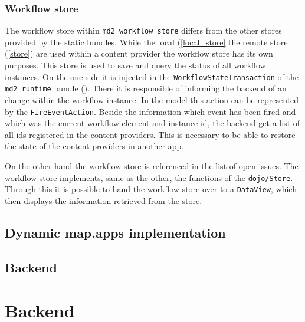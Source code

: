 \subsubsection{Workflow store} \label{workflow_store}

The workflow store within \lstinline|md2_workflow_store| differs from the other stores provided by the static bundles. While the local (\cref{local_store} the remote store (\cref{store}) are used within a content provider the workflow store has its own purposes. This store is used to save and query the status of all workflow instances. On the one side it is injected in the \lstinline|WorkflowStateTransaction| of the \lstinline|md2_runtime| bundle (). There it is responsible of informing the backend of an change within the workflow instance. In the model this action can be represented by the \lstinline|FireEventAction|. Beside the information which event has been fired and which was the current workflow element and instance id, the backend get a list of all ids registered in the content providers. This is necessary to be able to restore the state of the content providers in another app.

On the other hand the workflow store is referenced in the list of open issues. The workflow store implements, same as the other, the functions of the \lstinline|dojo/Store|. Through this it is possible to hand the workflow store over to a \lstinline|DataView|, which then displays the information retrieved from the store.


\subsection{Dynamic map.apps implementation} 

\subsection{Backend} 



\section{Backend}

